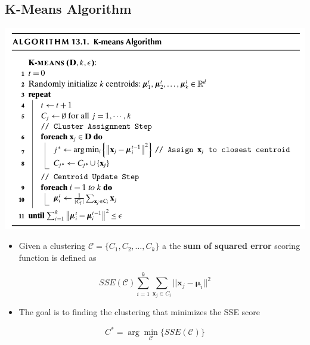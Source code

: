 \documentclass[11pt]{article}
\begin{document}
\subsection{K-Means Algorithm}
\label{sec:orgc7c4b04}
\begin{center}
\includegraphics[width=.9\linewidth]{Representative-based Clustering/screenshot_2018-11-25_09-22-03.png}
\end{center}

\begin{itemize}
\item Given a clustering \(\mathcal C = \{C_1, C_2, \dots, C_k\}\) a the \textbf{sum of squared error} scoring function is defined as
\end{itemize}
\begin{equation}
  SSE(\mathcal C) \sum_{i=1}^k \sum_{\pmb x_j \in C_i} ||\pmb x_j - \pmb \mu_i ||^2
\end{equation}
\begin{itemize}
\item The goal is to finding the clustering that minimizes the SSE score
\end{itemize}
\begin{equation}
  C^* = \arg \min_{\mathcal C} \{SSE(\mathcal C)\}
\end{equation}
\end{document}
